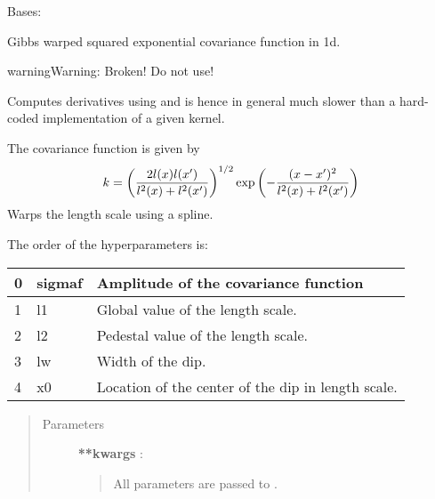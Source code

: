 \documentclass[letterpaper,10pt,english]{sphinxmanual}
\begin{document}

\begin{fulllineitems}
\label{gptools.kernel:gptools.kernel.gibbs.GibbsKernel1dSpline}
Bases: {\hyperref[gptools.kernel:gptools.kernel.core.ArbitraryKernel]{}}

Gibbs warped squared exponential covariance function in 1d.

\begin{notice}{warning}{Warning:}
Broken! Do not use!
\end{notice}

Computes derivatives using  and is hence in general
much slower than a hard-coded implementation of a given kernel.

The covariance function is given by
\begin{gather}
\begin{split}k = \left ( \frac{2l(x)l(x')}{l^2(x)+l^2(x')} \right )^{1/2}\exp\left ( -\frac{(x-x')^2}{l^2(x)+l^2(x')} \right )\end{split}\notag
\end{gather}
Warps the length scale using a spline.

The order of the hyperparameters is:

\begin{tabulary}{\linewidth}{|L|L|L|}
\hline

0
 & 
sigmaf
 & 
Amplitude of the covariance function
\\\hline

1
 & 
l1
 & 
Global value of the length scale.
\\\hline

2
 & 
l2
 & 
Pedestal value of the length scale.
\\\hline

3
 & 
lw
 & 
Width of the dip.
\\\hline

4
 & 
x0
 & 
Location of the center of the dip in length scale.
\\\hline
\end{tabulary}

\begin{quote}\begin{description}
\item[{Parameters }] \leavevmode
\textbf{**kwargs} :
\begin{quote}

All parameters are passed to {\hyperref[gptools.kernel:gptools.kernel.core.Kernel]{}}.
\end{quote}

\end{description}\end{quote}

\end{fulllineitems}
\end{document}
